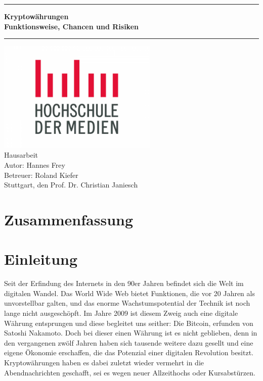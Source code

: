 \documentclass[12pt,oneside]{article}
\newcommand{\JMUTitle}[9]{

  \thispagestyle{empty}
  \vspace*{\stretch{1}}
  {\parindent0cm
  \rule{\linewidth}{.7ex}}
  \begin{flushright}
    \vspace*{\stretch{1}}
    \sffamily\bfseries\Huge
    #1\\
    \vspace*{\stretch{1}}
    \sffamily\bfseries\large
    #2
    \vspace*{\stretch{1}}
  \end{flushright}
  \rule{\linewidth}{.7ex}

  \vspace*{\stretch{1}}
  \begin{center}
    \includegraphics[width=3in]{logo} \\
    \vspace*{\stretch{1}}
    \Large Hausarbeit  \\

    \vspace*{\stretch{2}}
   \large Autor: Hannes Frey \\
    \vspace*{\stretch{1}}
    \large Betreuer:  Roland Kiefer \\[1mm]
    
    \vspace*{\stretch{1}}
    \large Stuttgart, den #6
  \end{center}
}
\begin{document}
  \JMUTitle
      {Kryptowährungen }        %
      {Funktionsweise, Chancen und Risiken}                        %
      
      {Wirtschaftswissenschaftlichen Fakultät}  %
      {W"urzburg 2018}                          %
      {31.05.2021}                              %
      {Prof. Dr. Christian Janiesch}               %
      {Zweitgutachter}                          %
      {Pr"ufungsdatum}                          %

  \clearpage

\lhead{}
    \setcounter{page}{1}

\tableofcontents
\clearpage

\listoffigures

\clearpage

\section*{Zusammenfassung}
\blindtext
\clearpage




\cleardoublepage
{}  
    \setcounter{page}{1}
\lhead{\nouppercase{\leftmark}}


\section{Einleitung} \label{einleitung}

Seit der Erfindung des Internets in den 90er Jahren befindet sich die Welt im digitalen Wandel. Das World Wide Web bietet Funktionen, die vor 20 Jahren als unvorstellbar galten, und das enorme Wachstumspotential der Technik ist noch lange nicht ausgeschöpft. Im Jahre 2009 ist diesem Zweig auch eine digitale Währung entsprungen und diese begleitet uns seither: Die Bitcoin, erfunden von Satoshi Nakamoto. 
Doch bei dieser einen Währung ist es nicht geblieben, denn in den vergangenen zwölf Jahren haben sich tausende weitere dazu gesellt und eine eigene Ökonomie erschaffen, die das Potenzial einer digitalen Revolution besitzt.
Kryptowährungen haben es dabei zuletzt wieder vermehrt in die Abendnachrichten geschafft, sei es wegen neuer Allzeithochs oder Kursabstürzen.\cite{schredder2018}
\end{document}
